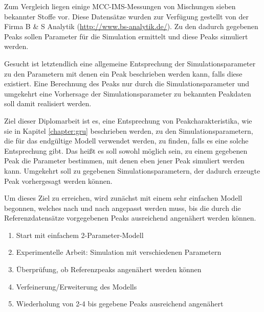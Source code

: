 Zum Vergleich liegen einige MCC-IMS-Messungen von Mischungen sieben bekannter Stoffe vor. Diese Datensätze wurden zur Verfügung gestellt von der Firma B \& S Analytik  (\mbox{\url{http://www.bs-analytik.de/}}). Zu den dadurch gegebenen Peaks sollen Parameter für die Simulation ermittelt und diese Peaks simuliert werden.

Gesucht ist letztendlich eine allgemeine Entsprechung der Simulationsparameter zu den Parametern mit denen ein Peak beschrieben werden kann, falls diese existiert. Eine Berechnung des Peaks nur durch die Simulationsparameter und umgekehrt eine Vorhersage der Simulationsparameter zu bekannten Peakdaten soll damit realisiert werden.

Ziel dieser Diplomarbeit ist es, eine Entsprechung von Peakcharakteristika, wie sie in Kapitel \ref{chapter:gru} beschrieben werden, zu den Simulationsparametern, die für das endgültige Modell verwendet werden, zu finden, falls es eine solche Entsprechung gibt.
Das heißt es soll sowohl möglich sein, zu einem gegebenen Peak die Parameter bestimmen, mit denen eben jener Peak simuliert werden kann. Umgekehrt soll zu gegebenen Simulationsparametern, der dadurch erzeugte Peak vorhergesagt werden können.

Um dieses Ziel zu erreichen, wird zunächst mit einem sehr einfachen Modell begonnen, welches nach und nach angepasst werden muss, bis die durch die Referenzdatensätze vorgegebenen Peaks ausreichend angenähert werden können.

\begin{enumerate}
 \item Start mit einfachem 2-Parameter-Modell
 \item Experimentelle Arbeit: Simulation mit verschiedenen Parametern
 \item Überprüfung, ob Referenzpeaks angenähert werden können
 \item Verfeinerung/Erweiterung des Modells
 \item Wiederholung von 2-4 bis gegebene Peaks ausreichend angenähert
\end{enumerate}

